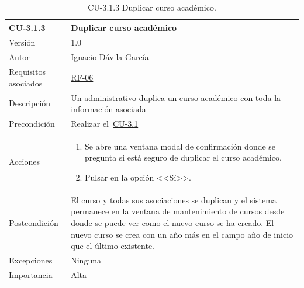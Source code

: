 \begin{table}[p]
	\centering
	\begin{tabularx}{\linewidth}{ p{} p{} }
		\toprule
		\textbf{CU-3.1.3}    & \textbf{Duplicar curso académico}\\
		\toprule
		{\small Versión}              & 1.0    \\
		{\small Autor}                & Ignacio Dávila García \\
		{\small Requisitos asociados} & \hyperref[itm:RF6]{RF-06} \\
		{\small Descripción}          & Un administrativo duplica un curso académico con toda la información asociada \\
		{\small Precondición}         & Realizar el~\hyperref[table:CU-3_1]{CU-3.1} \\
		{\small Acciones}             &
		\begin{enumerate}
			\def\labelenumi{\arabic{enumi}.}
			\tightlist
			\item Se abre una ventana modal de confirmación donde se pregunta si está seguro de duplicar el curso académico.
			\item Pulsar en la opción <<Sí>>.
		\end{enumerate}\\
		{\small Postcondición}        & El curso y todas sus asociaciones se duplican y el sistema permanece en la ventana de mantenimiento de cursos desde donde se puede ver como el nuevo curso se ha creado. El nuevo curso se crea con un año más en el campo año de inicio que el último existente. \\
		{\small Excepciones}          & Ninguna \\
		{\small Importancia}          & Alta \\
		\bottomrule
	\end{tabularx}
	\caption{CU-3.1.3 Duplicar curso académico.}\label{table:CU-3_1_3}
\end{table}
\FloatBarrier

